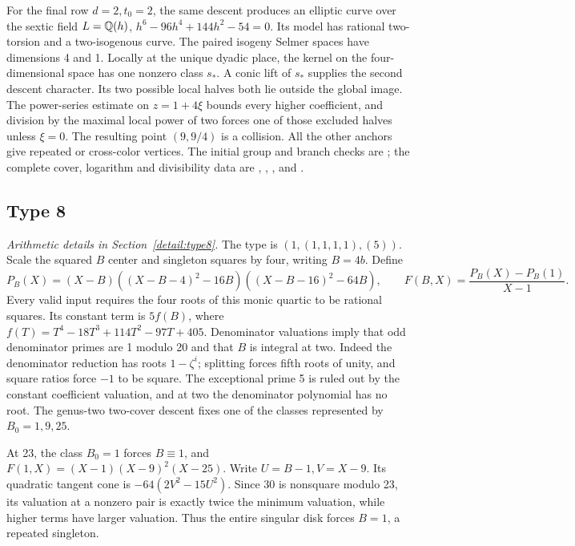 For the final row $d=2,t_0=2$, the same descent produces an elliptic
curve over the sextic field $L=\mathbb Q(h)$,
$h^6-96h^4+144h^2-54=0$. Its model has rational two-torsion and a
two-isogenous curve. The paired isogeny Selmer spaces have dimensions
4 and 1. Locally at the unique dyadic place, the kernel on the
four-dimensional space has one nonzero class $s_*$. A conic lift of
$s_*$ supplies the second descent character. Its two possible local
halves both lie outside the global image. The power-series estimate
on $z=1+4\xi$ bounds every higher coefficient, and division by the
maximal local power of two forces one of those excluded halves unless
$\xi=0$. The resulting point $(9,9/4)$ is a collision.
All the other anchors give repeated or cross-color vertices.
The initial group and branch checks are ;
the complete cover, logarithm and divisibility data are
, ,
,  and
.

\subsection{Type 8}\label{app:type8}
\noindent\emph{Arithmetic details in Section~\ref{detail:type8}.}\enspace
The type is $(1,(1,1,1,1),(5))$. Scale the squared $B$ center and
singleton squares by four, writing $B=4b$. Define
\[
 P_B(X)=(X-B)((X-B-4)^2-16B)((X-B-16)^2-64B),
 \qquad F(B,X)=\frac{P_B(X)-P_B(1)}{X-1}.
\]
Every valid input requires the four roots of this monic quartic to be
rational squares. Its constant term is $5f(B)$, where
$f(T)=T^4-18T^3+114T^2-97T+405$. Denominator valuations imply
that odd denominator primes are 1 modulo 20 and that $B$ is integral
at two. Indeed the denominator reduction has roots $1-\zeta^i$;
splitting forces fifth roots of unity, and square ratios force $-1$
to be square. The exceptional prime 5 is ruled out by the constant
coefficient valuation, and at two the denominator polynomial has no root.
The genus-two two-cover descent fixes one of the classes represented by
$B_0=1,9,25$.

At 23, the class $B_0=1$ forces $B\equiv1$, and
$F(1,X)=(X-1)(X-9)^2(X-25)$. Write $U=B-1,V=X-9$.
Its quadratic tangent cone is $-64(2V^2-15U^2)$. Since 30 is
nonsquare modulo 23, its valuation at a nonzero pair is exactly twice
the minimum valuation, while higher terms have larger valuation.
Thus the entire singular disk forces $B=1$, a repeated singleton.

